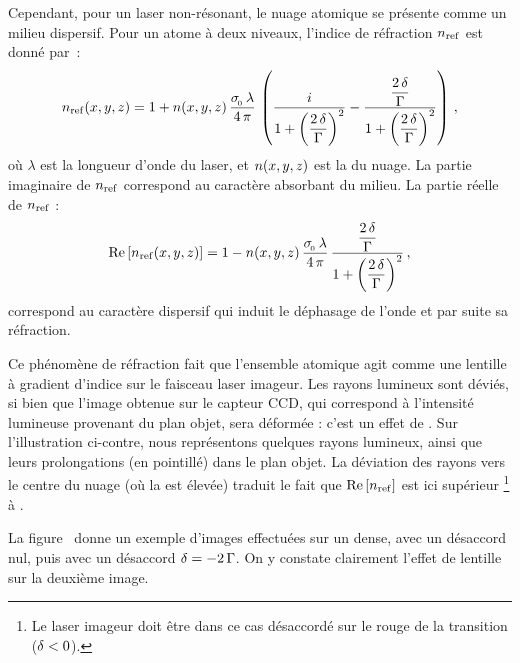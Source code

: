 Cependant, pour un laser non-résonant, le nuage atomique se présente comme un milieu dispersif. Pour un atome à deux niveaux, l'indice de réfraction ${n_{\rm ref}}$ est donné par~\cite{KDS99}:
\[
	{n_{\rm ref}}(x,y,z) 
= 1 + {n}(x,y,z) \, \frac{{\sigma_{_{\hspace{-1pt}{0}}}}\,\lambda}{4\,\pi} 
\, \left(
\frac{ {i} }{1+\left(\dfrac{2\,{\delta}}{{\Gamma}}\right)^2}
-
\frac{ \dfrac{2\,{\delta}}{{\Gamma}} }{1+\left(\dfrac{2\,{\delta}}{{\Gamma}}\right)^2}
\right)
\, ,
\]
%
où $\lambda$ est la longueur d'onde du laser, et ${n}(x,y,z)$ est la \dat du nuage. La partie imaginaire de ${n_{\rm ref}}$ correspond au caractère absorbant du milieu. La partie réelle de ${n_{\rm ref}}$ :
\begin{equation}
	{\nrefracxyz}
= 1 - \dens\xyz \, \frac{\seceff\,\lambda}{4\,\pi} 
\, \frac{ \dfrac{2\,\desac}{\pulsSpont} }{1+\left(\dfrac{2\,\desac}{\pulsSpont}\right)^2}
\virguleformule
	\label{eq:nrefraction}
\end{equation}
correspond au caractère dispersif qui induit le déphasage de l'onde et par suite sa réfraction.
 

\casse
 
%
Ce phénomène de réfraction fait que l'ensemble atomique agit comme une lentille à gradient d'indice sur le faisceau laser imageur. Les rayons lumineux sont déviés, si bien que l'image obtenue sur le capteur CCD, qui correspond à l'intensité lumineuse provenant du plan objet, sera déformée : c'est un effet de . Sur l'illustration ci-contre, nous représentons quelques rayons lumineux, ainsi que leurs prolongations (en pointillé) dans le plan objet. La déviation des rayons vers le centre du nuage (où la \dat est élevée) traduit le fait que ${{{\mathop{\mathrm{Re}}\left[{n_{\rm ref}}\right]}}}$ est ici supérieur%
\footnote{Le laser imageur doit être dans ce cas désaccordé sur le rouge de la transition (${\delta} < 0$).}
à .

La figure~ donne un exemple d'images effectuées sur un \nat dense, avec un désaccord nul, puis avec un désaccord ${\delta}=-2\,{\Gamma}$.
On y constate clairement l'effet de lentille sur la deuxième image.
\bfighss
{}\qquad
{}
\label{fig:ImageNuageDesaccorde}
\efigh


